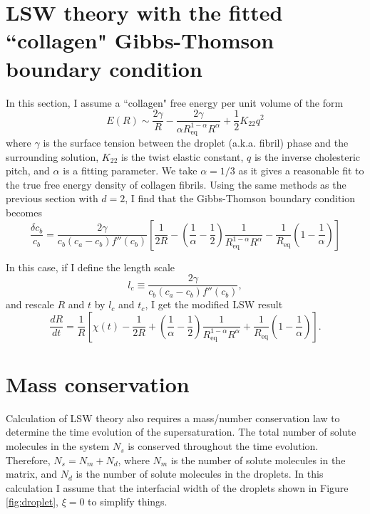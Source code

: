 \documentclass[12pt]{article}
\begin{document}
\section{LSW theory with the fitted ``collagen" Gibbs-Thomson boundary condition}
In this section, I assume a ``collagen" free energy per unit volume of the form
\begin{equation}\label{eq:colFE}
E(R)\sim \frac{2\gamma}{R}-\frac{2\gamma}{\alpha R_{\text{eq}}^{1-\alpha}R^{\alpha}}+\frac{1}{2}K_{22}q^2
\end{equation}
where $\gamma$ is the surface tension between the droplet (a.k.a. fibril) phase and the surrounding solution, $K_{22}$ is the twist elastic constant, $q$ is the inverse cholesteric pitch, and $\alpha$ is a fitting parameter. We take $\alpha=1/3$ as it gives a reasonable fit to the true free energy density of collagen fibrils. Using the same methods as the previous section with $d=2$, I find that the Gibbs-Thomson boundary condition becomes
\begin{equation}\label{eq:GT_col}
\frac{\delta c_b}{c_b}=\frac{2\gamma}{c_b(c_a-c_b)f''(c_b)}\left[\frac{1}{2R}-\left(\frac{1}{\alpha}-\frac{1}{2}\right)\frac{1}{R_{\text{eq}}^{1-\alpha}R^{\alpha}}-\frac{1}{R_{\text{eq}}}\left(1-\frac{1}{\alpha}\right)\right]
\end{equation}

In this case, if I define the length scale
\begin{equation}\label{eq:length_coll}
l_c\equiv\frac{2\gamma}{c_b(c_a-c_b)f''(c_b)},
\end{equation}
and rescale $R$ and $t$ by $l_c$ and $t_c$, I get the modified LSW result
\begin{equation}\label{eq:Rdot_coll}
\frac{dR}{dt}=\frac{1}{R}\left[\chi(t)-\frac{1}{2R}+\left(\frac{1}{\alpha}-\frac{1}{2}\right)\frac{1}{R_{\text{eq}}^{1-\alpha}R^{\alpha}}+\frac{1}{R_{\text{eq}}}\left(1-\frac{1}{\alpha}\right)\right].
\end{equation}

\section{Mass conservation}
Calculation of LSW theory also requires a mass/number conservation law to determine the time evolution of the supersaturation. The total number of solute molecules in the system $N_s$ is conserved throughout the time evolution. Therefore, $N_s=N_m+N_d$, where $N_m$ is the number of solute molecules in the matrix, and $N_d$ is the number of solute molecules in the droplets. In this calculation I assume that the interfacial width of the droplets shown in Figure \ref{fig:droplet}, $\xi=0$ to simplify things.
\end{document}
